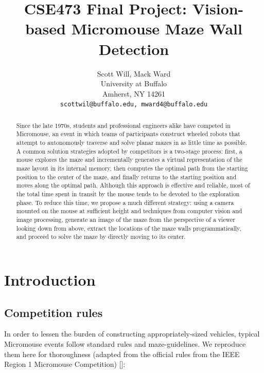 \documentclass[10pt,twocolumn,letterpaper]{article}
\begin{document}
\title{CSE473 Final Project: Vision-based Micromouse Maze Wall Detection}

\author{Scott Will, Mack Ward\\
University at Buffalo\\
Amherst, NY 14261\\
{\tt\small scottwil@buffalo.edu, mward4@buffalo.edu}
}

\maketitle

\begin{abstract}
	Since the late 1970s, students and professional engineers alike have competed in Micromouse, an event in which teams
	of participants construct wheeled robots that attempt to autonomously traverse and solve planar mazes in as little
	time as possible.  A common solution strategies adopted by competitors is a two-stage process: first, a mouse
	explores the maze and incrementally generates a virtual representation of the maze layout in its internal memory,
	then computes the optimal path from the starting position to the center of the maze, and finally returns to the
	starting position and moves along the optimal path.  Although this approach is effective and reliable, most of the
	total time spent in transit by the mouse tends to be devoted to the exploration phase.  To reduce this time, we
	propose a much different strategy: using a camera mounted on the mouse at sufficient height and techniques from
	computer vision and image processing, generate an image of the maze from the perspective of a viewer looking down
	from above, extract the locations of the maze walls programmatically, and proceed to solve the maze by directly
	moving to its center.
\end{abstract}

\section{Introduction}
\label{sec:introduction}

\subsection{Competition rules}
\label{sub:rules}
In order to lessen the burden of constructing appropriately-sized vehicles, typical Micromouse events follow standard
rules and maze-guidelines.  We reproduce them here for thoroughness (adapted from the official rules from the IEEE
Region 1 Micromouse
Competition) []:
\end{document}
